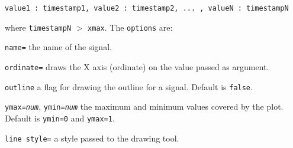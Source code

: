 \begin{verbatim}
value1 : timestamp1, value2 : timestamp2, ... , valueN : timestampN
\end{verbatim}

\noindent where \texttt{timestampN} $>$ \texttt{xmax}. The \texttt{options} are:

\begin{optionslist}
\item \texttt{name=} the name of the signal.
\item \texttt{ordinate=} draws the X axis (ordinate) on the value passed as argument.
\item \texttt{outline} a flag for drawing the outline for a signal. Default is \texttt{false}.
\item \texttt{ymax=\it num}, \texttt{ymin=\it num} the maximum and minimum values covered by the plot. Default is \texttt{ymin=0} and \texttt{ymax=1}.
\item \texttt{line style=} a style passed to the drawing tool.
\end{optionslist}

\newpage
\vspace*{\fill}%

